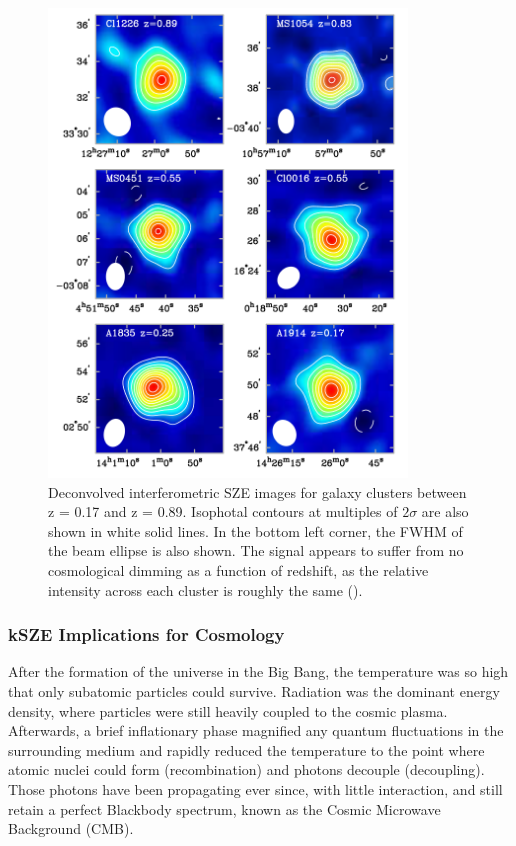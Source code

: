 \documentclass[manuscript]{aastex}
\begin{document}
\newpage
\begin{figure}[H]
\centering
\captionsetup{width=0.85\textwidth}
\includegraphics[width=0.85\textwidth]{carlstrom1.png}
\caption[An example of the redshift independence of SZE measurements for six different clusters. -(\cite{Carlstrom2002})]{Deconvolved interferometric SZE images for galaxy clusters between z = 0.17 and z = 0.89. Isophotal contours at multiples of \(2\sigma\) are also shown in white solid lines. In the bottom left corner, the FWHM of the beam ellipse is also shown. The signal appears to suffer from no cosmological dimming as a function of redshift, as the relative intensity across each cluster is roughly the same (\cite{Carlstrom2002}).}
\end{figure}

\subsubsection{kSZE Implications for Cosmology}

After the formation of the universe in the Big Bang, the temperature was so high that only subatomic particles could survive. Radiation was the dominant energy density, where particles were still heavily coupled to the cosmic plasma. Afterwards, a brief inflationary phase magnified any quantum fluctuations in the surrounding medium and rapidly reduced the temperature to the point where atomic nuclei could form (recombination) and photons decouple (decoupling). Those photons have been propagating ever since, with little interaction, and still retain a perfect Blackbody spectrum, known as the Cosmic Microwave Background (CMB). 
\end{document}
